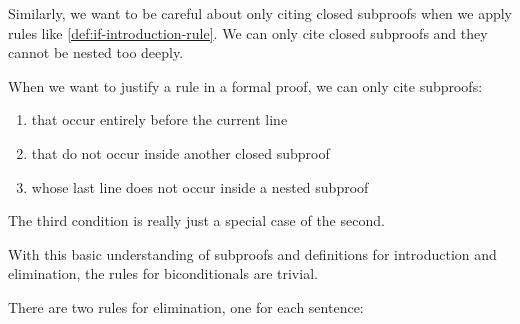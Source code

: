 Similarly, we want to be careful about only citing closed subproofs when we
apply rules like \ref{def:if-introduction-rule}. We can only cite closed
subproofs and they cannot be nested too deeply.

\begin{definition}
  \label{def:permissible-subproof-citations}
  When we want to justify a rule in a formal proof, we can only cite subproofs:
  \vspace{-0.9\baselineskip}
  \begin{enumerate}
  \item that occur entirely before the current line
  \item that do not occur inside another closed subproof
  \item whose last line does not occur inside a nested subproof
  \end{enumerate}  
\end{definition}

The third condition is really just a special case of the second.

With this basic understanding of subproofs and definitions for \eif
introduction and \eif elimination, the rules for biconditionals are trivial. 

\begin{fitchrule}
  \label{def:iff-elimination-rule}
  \leavevmode
  There are two rules for \eiff elimination, one for each sentence: \\
\end{fitchrule}

\begin{fitchrule}
  \label{def:iff-introduction-rule}
  \leavevmode
  \vspace{-0.9\baselineskip}
  \begin{fitchproof}
    \open
     {\ephi}           
     {\epsi}
    \close
    \open
     {\epsi}           
     {\ephi}
    \close
     {\ephi\eiff\epsi} 
  \end{fitchproof}
\end{fitchrule}

